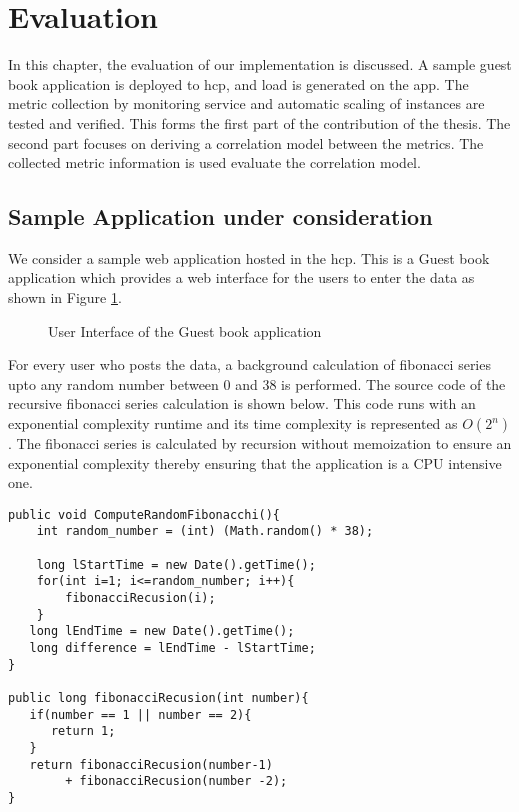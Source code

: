 \documentclass[article,type=msc,colorback,12pt,accentcolor=tud8b,table]{tudthesis}
\begin{document}
 \cleardoublepage
 
  \hfill 
 \section{Evaluation}
 \hfill \break
 
 In this chapter, the evaluation of our implementation is discussed. A sample guest book application is deployed to \gls{hcp}, and load is generated on the app. The metric collection by monitoring service and automatic scaling of instances are tested and verified. This forms the first part of the contribution of the thesis. The second part focuses on deriving a correlation model between the metrics. The collected metric information is used evaluate the correlation model. 

	\subsection{Sample Application under consideration}
We consider a sample web application hosted in the \gls{hcp}. This is a Guest book application which provides a web interface for the users to enter the data as shown in Figure \ref{fig:guestbook_ui}. 
 \begin{figure}[h]
 \begin{center}
  \makebox[\textwidth]{\texttt{[image: E1]}}
\end{center}
\caption{User Interface of the Guest book application}
\label{fig:guestbook_ui}
\end{figure}
For every user who posts the data, a background calculation of fibonacci series upto any random number between 0 and 38 is performed. The source code of the recursive fibonacci series calculation is shown below. This code runs with an exponential complexity runtime and its time complexity is represented as $O(2^n)$. The fibonacci series is calculated by recursion without memoization to ensure an exponential complexity thereby ensuring that the application is a CPU intensive one.
 \begin{lstlisting}
public void ComputeRandomFibonacchi(){		
	int random_number = (int) (Math.random() * 38);		
		
	long lStartTime = new Date().getTime();
	for(int i=1; i<=random_number; i++){
		fibonacciRecusion(i);
    }			
   long lEndTime = new Date().getTime();
   long difference = lEndTime - lStartTime;    	
}
		  
public long fibonacciRecusion(int number){
   if(number == 1 || number == 2){
      return 1;
   }
   return fibonacciRecusion(number-1) 
   		+ fibonacciRecusion(number -2); 
}
\end{lstlisting}
\end{document}
